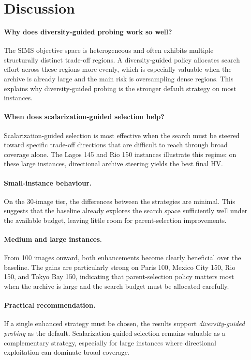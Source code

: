 \documentclass[11pt,a4paper]{article}
\begin{document}
\section{Discussion}\label{sec:discussion}

\paragraph{Why does diversity-guided probing work so well?}
The SIMS objective space is heterogeneous and often exhibits multiple
structurally distinct trade-off regions.  A diversity-guided policy
allocates search effort across these regions more evenly, which is
especially valuable when the archive is already large and the main risk
is oversampling dense regions.  This explains why diversity-guided
probing is the stronger default strategy on most instances.

\paragraph{When does scalarization-guided selection help?}
Scalarization-guided selection is most effective when the search must be
steered toward specific trade-off directions that are difficult to reach
through broad coverage alone.  The Lagos 145 and Rio 150 instances
illustrate this regime: on these large instances, directional archive
steering yields the best final HV.

\paragraph{Small-instance behaviour.}
On the 30-image tier, the differences between the strategies are
minimal.  This suggests that the baseline already explores the search
space sufficiently well under the available budget, leaving little room
for parent-selection improvements.

\paragraph{Medium and large instances.}
From 100 images onward, both enhancements become clearly beneficial over
the baseline.  The gains are particularly strong on Paris 100, Mexico
City 150, Rio 150, and Tokyo Bay 150, indicating that parent-selection
policy matters most when the archive is large and the search budget must
be allocated carefully.

\paragraph{Practical recommendation.}
If a single enhanced strategy must be chosen, the results support
\emph{diversity-guided probing} as the default.  Scalarization-guided
selection remains valuable as a complementary strategy, especially for
large instances where directional exploitation can dominate broad
coverage.
\end{document}
